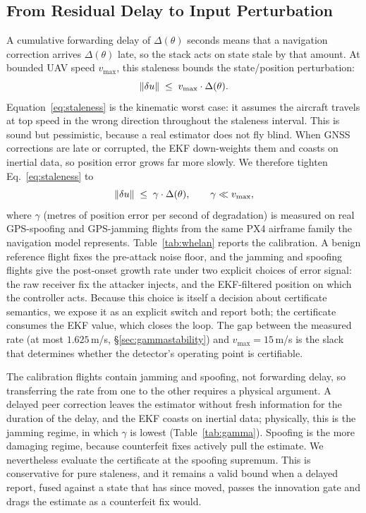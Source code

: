 \subsection{From Residual Delay to Input Perturbation}
A cumulative forwarding delay of $\Delta(\theta)$ seconds means that a
navigation correction arrives $\Delta(\theta)$ late, so the stack acts on state
stale by that amount. At bounded UAV speed $v_{\max}$, this staleness bounds the
state/position perturbation:
\begin{equation}
\label{eq:staleness}
\left\lVert \delta u\right\rVert \;\le\; v_{\max}\cdot \Delta(\theta).
\end{equation}
Equation~\eqref{eq:staleness} is the kinematic worst case: it assumes the
aircraft travels at top speed in the wrong direction throughout the staleness
interval. This is sound but pessimistic, because a real estimator does not fly
blind. When GNSS corrections are late or corrupted, the EKF down-weights them
and coasts on inertial data, so position error grows far more slowly. We
therefore tighten Eq.~\eqref{eq:staleness} to
\begin{equation}
\label{eq:gamma}
\left\lVert \delta u\right\rVert\;\le\;\gamma\cdot\Delta(\theta),\qquad \gamma\ll v_{\max},
\end{equation}
where $\gamma$ (metres of position error per second of degradation) is measured
on real GPS-spoofing and GPS-jamming flights from the same PX4 airframe family
the navigation model represents. Table~\ref{tab:whelan} reports the
calibration. A benign reference flight fixes the pre-attack noise floor, and the
jamming and spoofing flights give the post-onset growth rate under two explicit
choices of error signal: the raw receiver fix the attacker injects, and the
EKF-filtered position on which the controller acts. Because this choice is
itself a decision about certificate semantics, we expose it as an explicit
switch and report both; the certificate consumes the EKF value, which closes the
loop. The gap between the measured rate (at most $1.625$\,m/s,
\S\ref{sec:gammastability}) and $v_{\max}=15$\,m/s is the slack that determines
whether the detector's operating point is certifiable.

The calibration flights contain jamming and spoofing, not forwarding delay, so
transferring the rate from one to the other requires a physical argument. A
delayed peer correction leaves the estimator without fresh information for the
duration of the delay, and the EKF coasts on inertial data; physically, this is
the jamming regime, in which $\gamma$ is lowest (Table~\ref{tab:gamma}).
Spoofing is the more damaging regime, because counterfeit fixes actively pull
the estimate. We nevertheless evaluate the certificate at the spoofing
supremum. This is conservative for pure staleness, and it remains a
valid bound when a delayed report, fused against a state that has since moved,
passes the innovation gate and drags the estimate as a counterfeit fix would.


